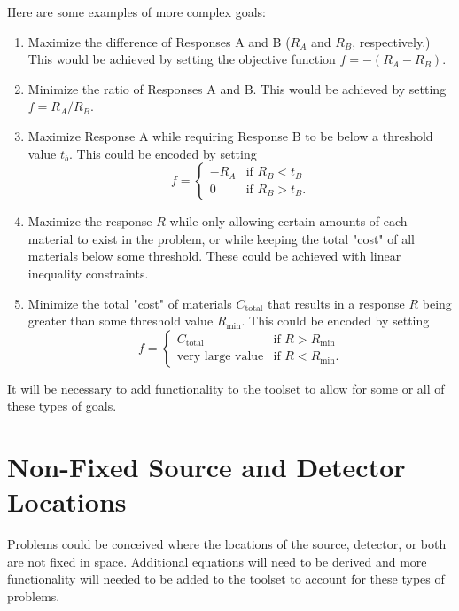 Here are some examples of more complex goals:
\begin{enumerate}
\item Maximize the difference of Responses A and B ($R_A$ and $R_B$, respectively.)
      This would be achieved by setting the objective function $f = -\left(R_A - R_B\right)$.
\item Minimize the ratio of Responses A and B.
      This would be achieved by setting $f = R_A/R_B$.
\item Maximize Response A while requiring Response B to be below a threshold value $t_b$.
      This could be encoded by setting \[f = \begin{cases} -R_A & \text{if } R_B < t_B \\ 0 & \text{if } R_B > t_B. \end{cases}\]
\item Maximize the response $R$ while only allowing certain amounts of each material to exist in the problem, or while keeping the total "cost" of all materials below some threshold.
      These could be achieved with linear inequality constraints.
\item Minimize the total "cost" of materials $C_\text{total}$ that results in a response $R$ being greater than some threshold value $R_\text{min}$.
      This could be encoded by setting \[f = \begin{cases} C_\text{total} & \text{if } R > R_\text{min} \\ \text{very large value} & \text{if } R < R_\text{min}. \end{cases}\]
\end{enumerate}

It will be necessary to add functionality to the toolset to allow for some or all of these types of goals.

\section{Non-Fixed Source and Detector Locations}
\label{sec:proposal:moving_source_and_detector}

Problems could be conceived where the locations of the source, detector, or both are not fixed in space.
Additional equations will need to be derived and more functionality will needed to be added to the toolset to account for these types of problems.

